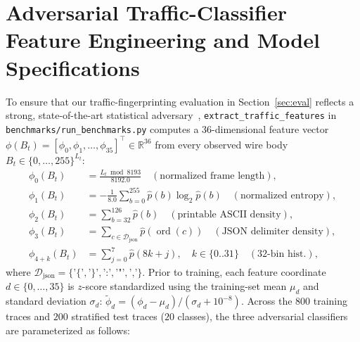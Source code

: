 \documentclass[conference,10pt]{IEEEtran}
\begin{document}
\section{Adversarial Traffic-Classifier Feature Engineering and Model Specifications}
\label{app:classifiers}

To ensure that our traffic-fingerprinting evaluation in Section~\ref{sec:eval} reflects a strong, state-of-the-art statistical adversary~\cite{dyer2012peekaboo, panchenko2016website, sirinam2018deep}, \texttt{extract\_traffic\_features} in \texttt{benchmarks/run\_benchmarks.py} computes a 36-dimensional feature vector $\phi(B_t) = [\phi_0, \phi_1, \dots, \phi_{35}]^\top \in \mathbb{R}^{36}$ from every observed wire body $B_t \in \{0,\dots,255\}^{L_t}$:
\begin{equation}
\label{eq:feature_vec}
\begin{aligned}
\phi_0(B_t) &= \frac{L_t \bmod 8193}{8192.0} \quad (\text{normalized frame length}), \\
\phi_1(B_t) &= -\frac{1}{8.0} \sum_{b=0}^{255} \hat{p}(b) \log_2 \hat{p}(b) \quad (\text{normalized entropy}), \\
\phi_2(B_t) &= \sum_{b=32}^{126} \hat{p}(b) \quad (\text{printable ASCII density}), \\
\phi_3(B_t) &= \sum_{c \in \mathcal{D}_{\text{json}}} \hat{p}(\operatorname{ord}(c)) \quad (\text{JSON delimiter density}), \\
\phi_{4 + k}(B_t) &= \sum_{j=0}^{7} \hat{p}(8k + j), \quad k \in \{0..31\} \quad (\text{32-bin hist.}),
\end{aligned}
\end{equation}
where $\mathcal{D}_{\text{json}} = \{\texttt{'\{'}, \texttt{'\}'}, \texttt{':'}, \texttt{'"'}, \texttt{','}\}$. Prior to training, each feature coordinate $d \in \{0,\dots,35\}$ is $z$-score standardized using the training-set mean $\mu_d$ and standard deviation $\sigma_d$: $\tilde{\phi}_d = (\phi_d - \mu_d)/(\sigma_d + 10^{-8})$. Across the $800$ training traces and $200$ stratified test traces ($20$ classes), the three adversarial classifiers are parameterized as follows:
\end{document}
